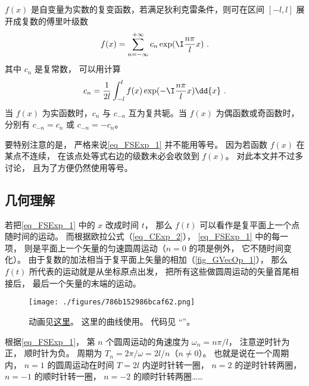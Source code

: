 
$f(x)$ 是自变量为实数的复变函数，若满足狄利克雷条件，则可在区间 $[- l,l]$ 展开成复数的傅里叶级数
\begin{equation}\label{eq_FSExp_1}
f(x) = \sum_{n =  - \infty }^{ + \infty } c_n \exp ( \I\frac{n\pi }{l}x )~.
\end{equation}
其中 $c_n$ 是复常数， 可以用计算
\begin{equation}\label{eq_FSExp_2}
c_n = \frac{1}{2l} \int_{ - l}^l  f(x)\exp( -\I\frac{n\pi }{l}x ) \dd{x} ~.
\end{equation}
当 $f(x)$ 为实函数时，$c_n$ 与 $c_{-n}$ 互为复共轭。当 $f(x)$ 为偶函数或奇函数时，分别有 $c_{-n} = c_n$ 或 $c_{-n} = -c_n$。

要特别注意的是， 严格来说\autoref{eq_FSExp_1} 并不能用等号。 因为若函数 $f(x)$ 在某点不连续， 在该点处等式右边的级数未必会收敛到 $f(x)$。 对此本文并不过多讨论， 且为了方便仍然使用等号。

\subsection{几何理解}
若把\autoref{eq_FSExp_1} 中的 $x$ 改成时间 $t$， 那么 $f(t)$ 可以看作是复平面上一个点随时间的运动。 而根据欧拉公式（\autoref{eq_CExp_2}）， \autoref{eq_FSExp_1} 中的每一项， 则是平面上一个矢量的匀速圆周运动（$n=0$ 的项是例外， 它不随时间变化）。 由于复数的加法相当于复平面上矢量的相加（\autoref{fig_GVecOp_1}）， 那么 $f(t)$ 所代表的运动就是从坐标原点出发， 把所有这些做圆周运动的矢量首尾相接后， 最后一个矢量的末端的运动。

\begin{figure}[ht]
\centering
\texttt{[image: ./figures/786b152986bcaf62.png]}
\caption{动画见\href{https://wuli.wiki/apps/FFTplt.html}{这里}。 这里的曲线使用。 代码见 “”。} \label{fig_FSExp_1}
\end{figure}

根据\autoref{eq_FSExp_1}， 第 $n$ 个圆周运动的角速度为 $\omega_n = n\pi/l$， 注意逆时针为正， 顺时针为负。 周期为 $T_n = 2\pi/\omega = 2l/n$（$n\ne 0$）。 也就是说在一个周期内， $n=1$ 的圆周运动在时间 $T = 2l$ 内逆时针转一圈， $n=2$ 的逆时针转两圈， $n=-1$ 的顺时针转一圈， $n=-2$ 的顺时针转两圈……

